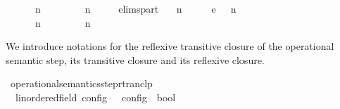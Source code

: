 \begin{isabellebody}
\ \ \ \ {\isasymLongrightarrow}\ {\isacharparenleft}{\isasymGamma}\ n\ {\isasymturnstile}\ {\isasymPsi}\ {\isasymtriangleright}\ {\isasymPhi}\ \ {\isasymhookrightarrow}\ \ {\isacharparenleft}{\isasymGamma}\ n\ {\isasymturnstile}\ {\isasymPsi}\ {\isasymtriangleright}\ {\isasymPhi}\isanewline
{\isacharbar}\ elims{\isacharunderscore}part{\isacharcolon}\isanewline
\ \ {\isacartoucheopen}{\isacharparenleft}{\isasymGamma}\ n\ {\isasymturnstile}\ {\isasymPsi}\ {\isasymtriangleright}\ {\isasymPhi}\ \ {\isasymhookrightarrow}\isactrlsub e\ \ {\isacharparenleft}{\isasymGamma}\ n\ {\isasymturnstile}\ {\isasymPsi}\ {\isasymtriangleright}\ {\isasymPhi}\isanewline
\ \ \ \ {\isasymLongrightarrow}\ {\isacharparenleft}{\isasymGamma}\ n\ {\isasymturnstile}\ {\isasymPsi}\ {\isasymtriangleright}\ {\isasymPhi}\ \ {\isasymhookrightarrow}\ \ {\isacharparenleft}{\isasymGamma}\ n\ {\isasymturnstile}\ {\isasymPsi}\ {\isasymtriangleright}\ {\isasymPhi}%
\begin{isamarkuptext}%
We introduce notations for the reflexive transitive closure of the operational 
  semantic step, its transitive closure and its reflexive closure.%
\end{isamarkuptext}\isamarkuptrue%
\isamarkupfalse%
\ operational{\isacharunderscore}semantics{\isacharunderscore}step{\isacharunderscore}rtranclp\isanewline
\ \ {\isacharcolon}{\isacharcolon}{\isacartoucheopen}{\isacharparenleft}{\isacharprime}{\isasymtau}{\isacharcolon}{\isacharcolon}linordered{\isacharunderscore}field{\isacharparenright}\ config\ {\isasymRightarrow}\ {\isacharprime}{\isasymtau}\ config\ {\isasymRightarrow}\ bool{\isacartoucheclose}\ \ \ \ \ \ \ \ \ \ \ \ \ \ {\isacharparenleft}{\isachardoublequoteopen}{\isacharunderscore}\ {\isasymhookrightarrow}\isactrlsup {\isacharasterisk}\isactrlsup {\isacharasterisk}\ {\isacharunderscore}{\isachardoublequoteclose}\ {}{}{\isacharparenright}\isanewline

\end{isabellebody}
